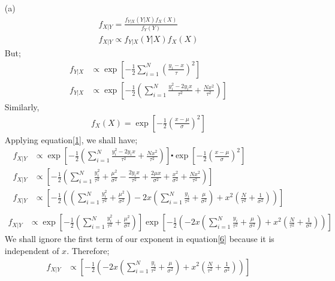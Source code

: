 \documentclass[12pt,a4paper]{article}
\begin{document}
\begin{itemize}
	\item [(a)]
\begin{align}
f_{X|Y}=\frac{f_{Y|X}(Y|X)f_{X}(X)}{f_{Y}(Y)}\\
f_{X|Y} \propto f_{Y|X}(Y|X)f_{X}(X) \label{1}
\end{align}
But;
\begin{align*}
f_{Y|X}& \propto \exp\left[-\frac{1}{2}\sum_{i=1}^{N}\left(\frac{y_{i}-x}{\tau} \right)^{2}\right]\\
f_{Y|X}&\propto \exp\left[-\frac{1}{2}\left(\sum_{i=1}^{N}\frac{y_{i}^{2}-2y_{i}x}{\tau^{2}}+\frac{Nx^{2}}{\tau^{2}}\right)\right]
\end{align*}
Similarly,
\begin{align*}
f_{X}(X)=\exp \left[-\frac{1}{2}\left(\frac{x-\mu}{\sigma}\right)^{2}\right]
\end{align*}
Applying equation\ref{1}, we shall have;
\begin{align*}
f_{X|Y} &\propto \exp\left[-\frac{1}{2}\left(\sum_{i=1}^{N}\frac{y_{i}^{2}-2y_{i}x}{\tau^{2}}+\frac{Nx^{2}}{\tau^{2}}\right)\right]\centerdot \exp \left[-\frac{1}{2}\left(\frac{x-\mu}{\sigma}\right)^{2}\right]\\
f_{X|Y}&\propto\left[-\frac{1}{2}\left(\sum_{i=1}^{N}\frac{y_{i}^{2}}{\tau^{2}}+\frac{\mu^{2}}{\sigma^{2}}-\frac{2y_{i}x}{\tau^{2}}+\frac{2\mu x}{\sigma^{2}}+\frac{x^{2}}{\sigma^{2}}+\frac{Nx^{2}}{\tau^{2}}\right)\right]\\
f_{X|Y}&\propto\left[-\frac{1}{2}\left(\left(\sum_{i=1}^{N}\frac{y_{i}^{2}}{\tau^{2}}+\frac{\mu^{2}}{\sigma^{2}}\right)-2x\left(\sum_{i=1}^{N}\frac{y_{i}}{\tau^{2}}+\frac{\mu}{\sigma^{2}}\right)+x^{2}\left(\frac{N}{\tau^{2}}+\frac{1}{\sigma^{2}}\right)\right)\right]\\
\end{align*}
\begin{align}
f_{X|Y}&\propto\exp\left[-\frac{1}{2}\left(\sum_{i=1}^{N}\frac{y_{i}^{2}}{\tau^{2}}+\frac{\mu^{2}}{\sigma^{2}}\right)\right]\exp\left[-\frac{1}{2}\left(-2x\left(\sum_{i=1}^{N}\frac{y_{i}}{\tau^{2}}+\frac{\mu}{\sigma^{2}}\right)+x^{2}\left(\frac{N}{\tau^{2}}+\frac{1}{\sigma^{2}}\right)\right)\right] \label{6}
\end{align}
We shall ignore the first term of our exponent in equation\ref{6} because it is independent of $x$. Therefore;
\begin{align}
f_{X|Y}&\propto\left[-\frac{1}{2}\left(-2x\left(\sum_{i=1}^{N}\frac{y_{i}}{\tau^{2}}+\frac{\mu}{\sigma^{2}}\right)+x^{2}\left(\frac{N}{\tau^{2}}+\frac{1}{\sigma^{2}}\right)\right)\right] \label{4}

\end{align}
\end{itemize}
\end{document}
